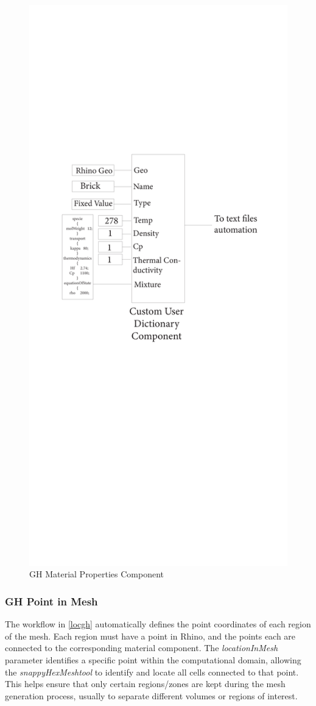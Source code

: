 \begin{figure}[H]
\centering
\includegraphics[trim=5cm 32cm 4.5cm 7cm, clip, width=0.55\linewidth]{Figures/THESISGH2.pdf}
\hspace{0.7cm}
\caption{\gls{GH} Material Properties Component}
\label{matgh}
\end{figure}





\subsubsection{\gls{GH} Point in Mesh}
The workflow in \ref{locgh} automatically defines the point coordinates of each region of the mesh. Each region must have a point in Rhino, and the points each are connected to the corresponding material component. The \textit{locationInMesh} parameter identifies a specific point within the computational domain, allowing the \textit{snappyHexMeshtool} to identify and locate all cells connected to that point. This helps ensure that only certain regions/zones are kept during the mesh generation process, usually to separate different volumes or regions of interest.


